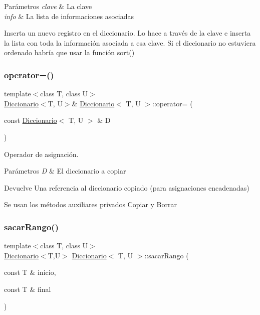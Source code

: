 \begin{DoxyParams}{Parámetros}
{\em clave} & La clave \\
\hline
{\em info} & La lista de informaciones asociadas\\
\hline
\end{DoxyParams}
Inserta un nuevo registro en el diccionario. Lo hace a través de la clave e inserta la lista con toda la información asociada a esa clave. Si el diccionario no estuviera ordenado habría que usar la función sort() \mbox{\label{classDiccionario_a5fa4a649047e6d270132bf0448a05915}} 
\subsubsection{\texorpdfstring{operator=()}{operator=()}}
{\footnotesize\ttfamily template$<$class T, class U$>$ \\
\hyperlink{classDiccionario}{Diccionario}$<$T, U$>$\& \hyperlink{classDiccionario}{Diccionario}$<$ T, U $>$\+::operator= (\begin{DoxyParamCaption}\item[{const \hyperlink{classDiccionario}{Diccionario}$<$ T, U $>$ \&}]{D }\end{DoxyParamCaption})\hspace{0.3cm}{\ttfamily [inline]}}



Operador de asignación. 


\begin{DoxyParams}{Parámetros}
{\em D} & El diccionario a copiar \\
\hline
\end{DoxyParams}
\begin{DoxyReturn}{Devuelve}
Una referencia al diccionario copiado (para asignaciones encadenadas)
\end{DoxyReturn}
Se usan los métodos auxiliares privados Copiar y Borrar \mbox{\label{classDiccionario_a13c55d999b1bcc0a0319659f5bc5dba4}} 
\subsubsection{\texorpdfstring{sacar\+Rango()}{sacarRango()}}
{\footnotesize\ttfamily template$<$class T, class U$>$ \\
\hyperlink{classDiccionario}{Diccionario}$<$T,U$>$ \hyperlink{classDiccionario}{Diccionario}$<$ T, U $>$\+::sacar\+Rango (\begin{DoxyParamCaption}\item[{const T \&}]{inicio,  }\item[{const T \&}]{final }\end{DoxyParamCaption})}




